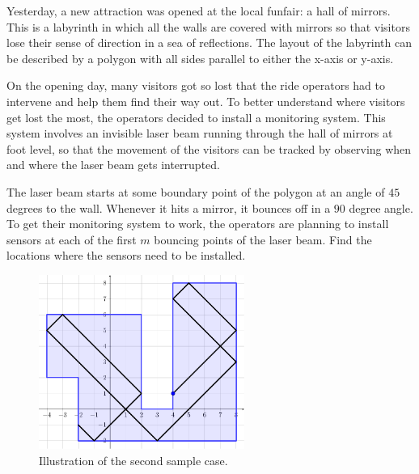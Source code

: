 
Yesterday, a new attraction was opened at the local funfair: a hall of mirrors.
This is a labyrinth in which all the walls are covered with mirrors so that
visitors lose their sense of direction in a sea of reflections. The layout of
the labyrinth can be described by a polygon with all sides parallel to either
the x-axis or y-axis.
\medskip

On the opening day, many visitors got so lost that the ride operators had to
intervene and help them find their way out. To better understand where visitors
get lost the most, the operators decided to install a monitoring system. This
system involves an invisible laser beam running through the hall of mirrors at
foot level, so that the movement of the visitors can be tracked by observing
when and where the laser beam gets interrupted.
\medskip

The laser beam starts at some boundary point of the polygon at an angle of $45$
degrees to the wall. Whenever it hits a mirror, it bounces off in a $90$ degree
angle. To get their monitoring system to work, the operators are planning to
install sensors at each of the first $m$ bouncing points of the laser beam.
Find the locations where the sensors need to be installed.
\bigskip

\begin{figure}[!h]
  \centering
  \includegraphics[width=0.6\textwidth]{sample2}
  \caption{Illustration of the second sample case.}
\end{figure}
\bigskip

